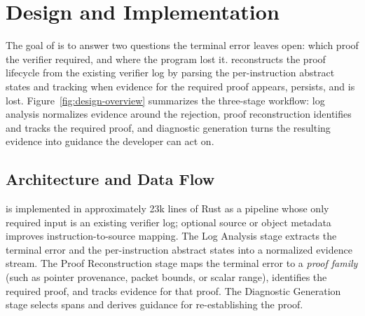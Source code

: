 \section{\sys Design and Implementation}
\label{sec:design}



The goal of \sys is to answer two questions the terminal error leaves open: which proof the verifier required, and where the program lost it.
\sys reconstructs the proof lifecycle from the existing verifier log by parsing the per-instruction abstract states and tracking when evidence for the required proof appears, persists, and is lost.
Figure~\ref{fig:design-overview} summarizes the three-stage workflow: log analysis normalizes evidence around the rejection, proof reconstruction identifies and tracks the required proof, and diagnostic generation turns the resulting evidence into guidance the developer can act on.

\subsection{Architecture and Data Flow}
\label{sec:design-architecture}

\sys is implemented in approximately 23k lines of Rust as a pipeline whose only required input is an existing verifier log; optional source or object metadata improves instruction-to-source mapping.
The Log Analysis stage extracts the terminal error and the per-instruction abstract states into a normalized evidence stream.
The Proof Reconstruction stage maps the terminal error to a \emph{proof family} (such as pointer provenance, packet bounds, or scalar range), identifies the required proof, and tracks evidence for that proof.
The Diagnostic Generation stage selects spans and derives guidance for re-establishing the proof.

